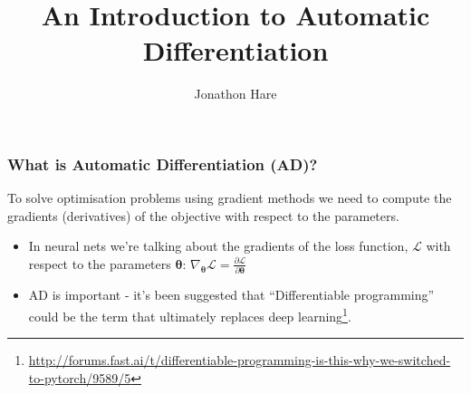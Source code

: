 \documentclass[\beamerclass]{beamer}
\title[Automatic Differentiation]{An Introduction to Automatic Differentiation}
\author{Jonathon Hare}
\institute[]
{
  Vision, Learning and Control\\
  University of Southampton 
}
\date{}
\begin{document}
\begin{frame}[plain]
\end{frame}


\begin{frame}
\frametitle{What is Automatic Differentiation (AD)?}
To solve optimisation problems using gradient methods we need to compute the gradients (derivatives) of the objective with respect to the parameters.
\begin{itemize}
	\item In neural nets we're talking about the gradients of the loss function, $\mathcal{L}$ with respect to the parameters $\bm{\theta}$: 
	$\nabla_{\bm{\theta}} \mathcal{L} = \frac{\partial \mathcal{L}}{\partial \bm{\theta}}$
	\item AD is important - it's been suggested that ``Differentiable programming'' could be the term that ultimately replaces deep learning\footnote{\url{http://forums.fast.ai/t/differentiable-programming-is-this-why-we-switched-to-pytorch/9589/5}}.
\end{itemize}
\end{frame}
\end{document}
